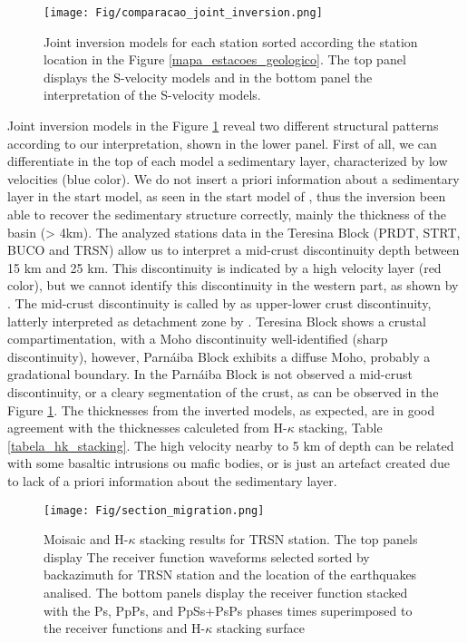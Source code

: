 \documentclass[paper,11pt]{geophysics}
\begin{document}
\begin{figure}[!ht]
\centering
\texttt{[image: Fig/comparacao\_joint\_inversion.png]}
\caption{Joint inversion models for each station sorted according the station location in the Figure \ref{mapa_estacoes_geologico}. The top panel displays the S-velocity models and in the bottom panel the interpretation of the S-velocity models.}
\label{moisaic_joint_inversion}
\end{figure}

Joint inversion models in the Figure \ref{moisaic_joint_inversion} reveal two different structural patterns according to our interpretation, shown in the lower panel.  First of all, we can differentiate in the top of each model a sedimentary layer, characterized by low velocities (blue color). We do not insert a priori information about a sedimentary layer in the start model, as seen in the start model of \cite{almeida_crustal_2015}, thus the inversion been able to recover the sedimentary structure correctly, mainly the thickness of the basin (> 4km). The analyzed stations data in the Teresina Block (PRDT, STRT, BUCO and TRSN) allow us to interpret a mid-crust discontinuity depth between 15 km and 25 km. This discontinuity is indicated by a high velocity layer (red color), but we cannot identify this discontinuity in the western part, as shown by \cite{daly_brasiliano_2014}. The mid-crust discontinuity is called by \cite{pavao_upper_lower_2013} as upper-lower crust discontinuity, latterly interpreted as detachment zone by \cite{almeida_crustal_2015}. Teresina Block shows a crustal compartimentation, with a Moho discontinuity well-identified (sharp discontinuity), however, Parnáiba Block exhibits a diffuse Moho, probably a gradational boundary. In the Parnáiba Block is not observed a mid-crust discontinuity, or a cleary segmentation of the crust, as can be observed in the Figure \ref{moisaic_joint_inversion}. The thicknesses from the inverted models, as expected, are in good agreement with the thicknesses calculeted from H-$\kappa$ stacking, Table \ref{tabela_hk_stacking}. The high velocity nearby to 5 km of depth can be related with some basaltic intrusions ou mafic bodies, or is just an artefact created due to lack of a priori information about the sedimentary layer.

\begin{figure}[!ht]
\centering
\texttt{[image: Fig/section\_migration.png]}
\caption{Moisaic and H-$\kappa$ stacking results for TRSN station. The top panels display The receiver function waveforms selected sorted by backazimuth for TRSN station and the location of the earthquakes analised. The bottom panels display the receiver function stacked with the Ps, PpPs, and PpSs+PsPs phases times superimposed to the receiver functions and H-$\kappa$ stacking surface}
\label{moisaic_migration}
\end{figure}
\end{document}
